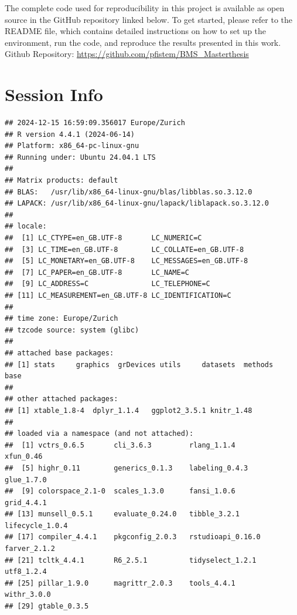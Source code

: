 \documentclass[11pt, a4paper]{article}\usepackage[]{graphicx}\usepackage[]{xcolor}
\makeatletter
\newenvironment{kframe}{%
 \def\at@end@of@kframe{}%
 \ifinner\ifhmode%
  \def\at@end@of@kframe{\end{minipage}}%
  \begin{minipage}{\columnwidth}%
 \fi\fi%
 \def\FrameCommand##1{\hskip\@totalleftmargin \hskip-\fboxsep
 \colorbox{shadecolor}{##1}\hskip-\fboxsep
     \hskip-\linewidth \hskip-\@totalleftmargin \hskip\columnwidth}%
 \MakeFramed {\advance\hsize-\width
   \@totalleftmargin\z@ \linewidth\hsize
   \@setminipage}}%
 {\par\unskip\endMakeFramed%
 \at@end@of@kframe}
\newenvironment{knitrout}{}{} %
\makeatother
\begin{document}
{

The complete code used for reproducibility in this project is available as open source in the GitHub repository linked below. To get started, please refer to the README file, which contains detailed instructions on how to set up the environment, run the code, and reproduce the results presented in this work.\\

Github Repository: \url{https://github.com/pfistem/BMS_Masterthesis}


\section{Session Info} \label{sec:session_info}
\begin{knitrout}
\color{fgcolor}\begin{kframe}
\begin{verbatim}
## 2024-12-15 16:59:09.356017 Europe/Zurich
## R version 4.4.1 (2024-06-14)
## Platform: x86_64-pc-linux-gnu
## Running under: Ubuntu 24.04.1 LTS
## 
## Matrix products: default
## BLAS:   /usr/lib/x86_64-linux-gnu/blas/libblas.so.3.12.0 
## LAPACK: /usr/lib/x86_64-linux-gnu/lapack/liblapack.so.3.12.0
## 
## locale:
##  [1] LC_CTYPE=en_GB.UTF-8       LC_NUMERIC=C              
##  [3] LC_TIME=en_GB.UTF-8        LC_COLLATE=en_GB.UTF-8    
##  [5] LC_MONETARY=en_GB.UTF-8    LC_MESSAGES=en_GB.UTF-8   
##  [7] LC_PAPER=en_GB.UTF-8       LC_NAME=C                 
##  [9] LC_ADDRESS=C               LC_TELEPHONE=C            
## [11] LC_MEASUREMENT=en_GB.UTF-8 LC_IDENTIFICATION=C       
## 
## time zone: Europe/Zurich
## tzcode source: system (glibc)
## 
## attached base packages:
## [1] stats     graphics  grDevices utils     datasets  methods   base     
## 
## other attached packages:
## [1] xtable_1.8-4  dplyr_1.1.4   ggplot2_3.5.1 knitr_1.48   
## 
## loaded via a namespace (and not attached):
##  [1] vctrs_0.6.5       cli_3.6.3         rlang_1.1.4       xfun_0.46        
##  [5] highr_0.11        generics_0.1.3    labeling_0.4.3    glue_1.7.0       
##  [9] colorspace_2.1-0  scales_1.3.0      fansi_1.0.6       grid_4.4.1       
## [13] munsell_0.5.1     evaluate_0.24.0   tibble_3.2.1      lifecycle_1.0.4  
## [17] compiler_4.4.1    pkgconfig_2.0.3   rstudioapi_0.16.0 farver_2.1.2     
## [21] tcltk_4.4.1       R6_2.5.1          tidyselect_1.2.1  utf8_1.2.4       
## [25] pillar_1.9.0      magrittr_2.0.3    tools_4.4.1       withr_3.0.0      
## [29] gtable_0.3.5
\end{verbatim}
\end{kframe}
\end{knitrout}

\newpage
\nocite{R}


\vfill
\footnotesize
\end{document}
